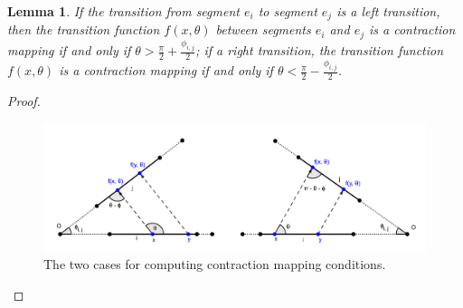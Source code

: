 \documentclass[]{article}
\newtheorem{lemma}{Lemma}
\begin{document}
\begin{lemma} \label{lemma:angrange}
If the transition from segment $e_i$ to segment $e_j$ is a left transition, then the
transition function $f(x, \theta)$ between segments $e_i$ and $e_j$ is a contraction
mapping if and only if $\theta > \frac{\pi}{2}+\frac{\phi_{i, j}}{2}$;
if a right transition, the transition function $f(x, \theta)$ is a contraction mapping if
and only if $\theta < \frac{\pi}{2}-\frac{\phi_{i, j}}{2}$.
\end{lemma}

\begin{proof}

\begin{figure}
    \includegraphics[width=1\linewidth]{figures/contraction_map_cond.png}
    \centering
    \caption{The two cases for computing contraction mapping conditions. \label{fig:cont_map}}
    \centering
\end{figure}


\end{proof}
\end{document}
